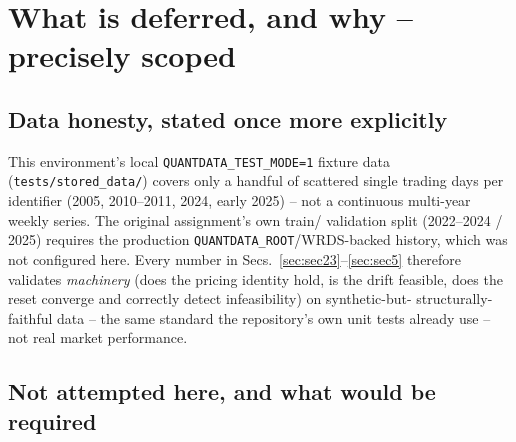 \section{What is deferred, and why -- precisely scoped}
\label{sec:deferred}

\subsection{Data honesty, stated once more explicitly}

This environment's local \texttt{QUANTDATA\_TEST\_MODE=1} fixture data
(\texttt{tests/stored\_data/}) covers only a handful of scattered single
trading days per identifier (2005, 2010--2011, 2024, early 2025) -- not a
continuous multi-year weekly series. The original assignment's own train/
validation split (2022--2024 / 2025) requires the production
\texttt{QUANTDATA\_ROOT}/WRDS-backed history, which was not configured here.
Every number in Secs.~\ref{sec:sec23}--\ref{sec:sec5} therefore validates
\emph{machinery} (does the pricing identity hold, is the drift feasible, does
the reset converge and correctly detect infeasibility) on synthetic-but-
structurally-faithful data -- the same standard the repository's own unit
tests already use -- not real market performance.

\subsection{Not attempted here, and what would be required}

